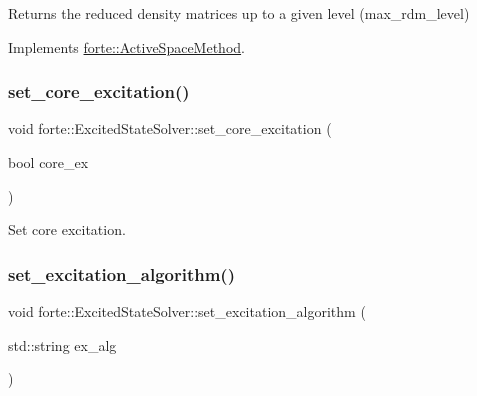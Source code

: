Returns the reduced density matrices up to a given level (max\+\_\+rdm\+\_\+level) 



Implements \mbox{\hyperlink{classforte_1_1_active_space_method_a0b2c4903551a7602db815d67349ba7c9}{forte\+::\+Active\+Space\+Method}}.

\mbox{\label{classforte_1_1_excited_state_solver_a50494c293ba4bed55b8ce4c7585c93ee}} 
\subsubsection{\texorpdfstring{set\+\_\+core\+\_\+excitation()}{set\_core\_excitation()}}
{\footnotesize\ttfamily void forte\+::\+Excited\+State\+Solver\+::set\+\_\+core\+\_\+excitation (\begin{DoxyParamCaption}\item[{bool}]{core\+\_\+ex }\end{DoxyParamCaption})}



Set core excitation. 

\mbox{\label{classforte_1_1_excited_state_solver_aa6a0c135e584b27da5ad2bc6bf6d9cc3}} 
\subsubsection{\texorpdfstring{set\+\_\+excitation\+\_\+algorithm()}{set\_excitation\_algorithm()}}
{\footnotesize\ttfamily void forte\+::\+Excited\+State\+Solver\+::set\+\_\+excitation\+\_\+algorithm (\begin{DoxyParamCaption}\item[{std\+::string}]{ex\+\_\+alg }\end{DoxyParamCaption})}



